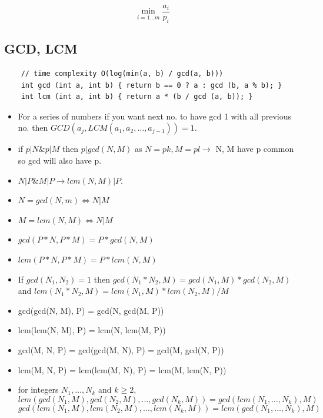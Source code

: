 \documentclass[8pt, a4paper, oneside, twocolumn]{extarticle}
\begin{document}
$$\min_ {i=1 \ldots m} \dfrac{a_i}{p_i}$$
\subsection{GCD, LCM}
\begin{verbatim}
    // time complexity O(log(min(a, b) / gcd(a, b)))
    int gcd (int a, int b) { return b == 0 ? a : gcd (b, a % b); }
    int lcm (int a, int b) { return a * (b / gcd (a, b)); }
\end{verbatim}
\begin{itemize}
    \item For a series of numbers if you want next no. to have gcd 1 with all previous no. then $GCD(a_j, LCM(a_1, a_2, \dots, a_{j - 1})) = 1$.
    \item if $p|N \& p|M$ then $p|gcd(N, M)$ as $N = pk, M = pl \rightarrow$ N, M have p common so gcd will also have p.
    \item $N|P \& M|P \rightarrow lcm(N, M)|P$.
    \item $N = gcd(N, m) \Leftrightarrow N|M$
    \item $M = lcm(N, M) \Leftrightarrow N|M$
    \item $gcd(P*N, P*M) = P*gcd(N, M)$
    \item $lcm(P*N, P*M) = P*lcm(N, M)$
    \item If $gcd(N_1, N_2) = 1$ then $gcd(N_1 * N_2, M) = gcd(N_1, M) * gcd(N_2, M)$ and $lcm(N_1*N_2, M) = lcm(N_1, M)*lcm(N_2, M)/M$
    \item gcd(gcd(N, M), P) = gcd(N, gcd(M, P))
    \item lcm(lcm(N, M), P) = lcm(N, lcm(M, P))
    \item gcd(M, N, P) = gcd(gcd(M, N), P) = gcd(M, gcd(N, P))
    \item lcm(M, N, P) = lcm(lcm(M, N), P) = lcm(M, lcm(N, P))
    \item for integers $N_1, \dots, N_k$ and $k \geq 2$, 
    $$lcm(gcd(N_1, M), gcd(N_2, M), \dots, gcd(N_k, M)) = gcd(lcm(N_1, \dots, N_k), M)$$
    $$gcd(lcm(N_1, M), lcm(N_2, M), \dots, lcm(N_k, M)) = lcm(gcd(N_1, \dots, N_k), M)$$
\end{itemize}
\end{document}

